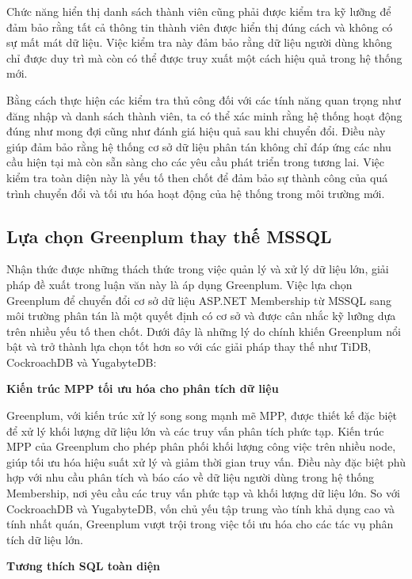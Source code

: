 \documentclass[14pt]{article}
\begin{document}
Chức năng hiển thị danh sách thành viên cũng phải được kiểm tra kỹ lưỡng để đảm bảo rằng tất cả thông tin thành viên được hiển thị đúng cách và không có sự mất mát dữ liệu. Việc kiểm tra này đảm bảo rằng dữ liệu người dùng không chỉ được duy trì mà còn có thể được truy xuất một cách hiệu quả trong hệ thống mới.

Bằng cách thực hiện các kiểm tra thủ công đối với các tính năng quan trọng như đăng nhập và danh sách thành viên, ta có thể xác minh rằng hệ thống hoạt động đúng như mong đợi cũng như đánh giá hiệu quả sau khi chuyển đổi. Điều này giúp đảm bảo rằng hệ thống cơ sở dữ liệu phân tán không chỉ đáp ứng các nhu cầu hiện tại mà còn sẵn sàng cho các yêu cầu phát triển trong tương lai. Việc kiểm tra toàn diện này là yếu tố then chốt để đảm bảo sự thành công của quá trình chuyển đổi và tối ưu hóa hoạt động của hệ thống trong môi trường mới.

\subsection{Lựa chọn Greenplum thay thế MSSQL}

Nhận thức được những thách thức trong việc quản lý và xử lý dữ liệu lớn, giải pháp đề xuất trong luận văn này là áp dụng Greenplum. Việc lựa chọn Greenplum để chuyển đổi cơ sở dữ liệu ASP.NET Membership từ MSSQL sang môi trường phân tán là một quyết định có cơ sở và được cân nhắc kỹ lưỡng dựa trên nhiều yếu tố then chốt. Dưới đây là những lý do chính khiến Greenplum nổi bật và trở thành lựa chọn tốt hơn so với các giải pháp thay thế như TiDB, CockroachDB và YugabyteDB:

\textbf{Kiến trúc MPP tối ưu hóa cho phân tích dữ liệu}

Greenplum, với kiến trúc xử lý song song mạnh mẽ MPP, được thiết kế đặc biệt để xử lý khối lượng dữ liệu lớn và các truy vấn phân tích phức tạp. Kiến trúc MPP của Greenplum cho phép phân phối khối lượng công việc trên nhiều node, giúp tối ưu hóa hiệu suất xử lý và giảm thời gian truy vấn. Điều này đặc biệt phù hợp với nhu cầu phân tích và báo cáo về dữ liệu người dùng trong hệ thống Membership, nơi yêu cầu các truy vấn phức tạp và khối lượng dữ liệu lớn. So với CockroachDB và YugabyteDB, vốn chủ yếu tập trung vào tính khả dụng cao và tính nhất quán, Greenplum vượt trội trong việc tối ưu hóa cho các tác vụ phân tích dữ liệu lớn.

\textbf{Tương thích SQL toàn diện}
\end{document}
